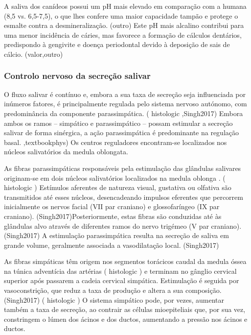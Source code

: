 A saliva dos canídeos possui um pH mais elevado em comparação com a humana (8,5 vs. 6,5-7,5), o que lhes confere uma maior capacidade tampão e protege o esmalte contra a desmineralização. (outro) Este pH mais alcalino contribui para uma menor incidência de cáries, mas favorece a formação de cálculos dentários, predispondo à gengivite e doença periodontal devido à deposição de sais de cálcio. (valor,outro)    

\subsubsection{Controlo nervoso da secreção salivar}

O fluxo salivar é contínuo e, embora a sua taxa de secreção seja influenciada por inúmeros fatores, é principalmente regulada pelo sistema nervoso autónomo, com predominância da componente parassimpática. (\cite{Poirier2018} histologic \cite{Bae2024},Singh2017) Embora ambos os ramos – simpático e parassimpático – possam estimular a secreção salivar de forma sinérgica, a ação parassimpática é predominante na regulação basal. \cite{lobprise_oral_2019},textbookphys) 
Os centros reguladores encontram-se localizados nos núcleos salivatórios da medula oblongata. \cite{lobprise_oral_2019}


As fibras parassimpáticas responsáveis pela estimulação das glândulas salivares originam-se em dois núcleos salivatórios localizados na medula oblonga . (\cite{Poirier2018} histologic \cite{Bae2024}) Estímulos aferentes de natureza visual, gustativa ou olfativa são transmitidos até esses núcleos, desencadeando impulsos eferentes que percorrem inicialmente os nervos facial (VII par craniano) e glossofaríngeo (IX par craniano). (Singh2017)Posteriormente, estas fibras são conduzidas até às glândulas alvo através de diferentes ramos do nervo trigémeo (V par craniano). (Singh2017) A estimulação parassimpática resulta na secreção de saliva em grande volume, geralmente associada a vasodilatação local. (Singh2017)


As fibras simpáticas têm origem nos segmentos torácicos caudal da medula óssea na túnica adventícia das artérias (\cite{Poirier2018} histologic \cite{Bae2024}) e terminam no gânglio cervical superior após passarem a cadeia cervical simpática. Estimulação é seguida por vasoconstrição, que reduz a taxa de produção e altera a sua composição. (Singh2017) (\cite{Poirier2018} histologic \cite{Bae2024}) O sistema simpático pode, por vezes, aumentar também a taxa de secreção, ao contrair as células mioepiteliais que, por sua vez, constringem o lúmen dos ácinos e dos ductos, aumentando a pressão nos ácinos e ductos. \cite{lobprise_oral_2019}


